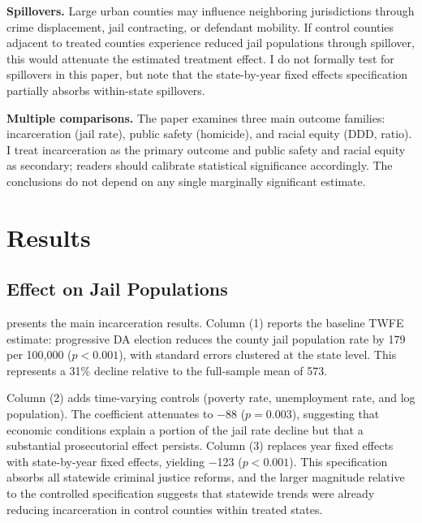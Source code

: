 \documentclass[12pt]{article}
\begin{document}
\textbf{Spillovers.} Large urban counties may influence neighboring jurisdictions through crime displacement, jail contracting, or defendant mobility. If control counties adjacent to treated counties experience reduced jail populations through spillover, this would attenuate the estimated treatment effect. I do not formally test for spillovers in this paper, but note that the state-by-year fixed effects specification partially absorbs within-state spillovers.

\textbf{Multiple comparisons.} The paper examines three main outcome families: incarceration (jail rate), public safety (homicide), and racial equity (DDD, ratio). I treat incarceration as the primary outcome and public safety and racial equity as secondary; readers should calibrate statistical significance accordingly. The conclusions do not depend on any single marginally significant estimate.


\section{Results}

\subsection{Effect on Jail Populations}

 presents the main incarceration results. Column (1) reports the baseline TWFE estimate: progressive DA election reduces the county jail population rate by 179 per 100,000 ($p < 0.001$), with standard errors clustered at the state level. This represents a 31\% decline relative to the full-sample mean of 573.

Column (2) adds time-varying controls (poverty rate, unemployment rate, and log population). The coefficient attenuates to $-$88 ($p = 0.003$), suggesting that economic conditions explain a portion of the jail rate decline but that a substantial prosecutorial effect persists. Column (3) replaces year fixed effects with state-by-year fixed effects, yielding $-$123 ($p < 0.001$). This specification absorbs all statewide criminal justice reforms, and the larger magnitude relative to the controlled specification suggests that statewide trends were already reducing incarceration in control counties within treated states.
\end{document}
